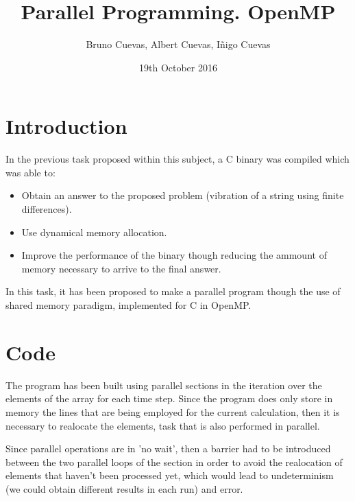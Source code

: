 \documentclass{article}
\title{Parallel Programming. OpenMP}
\author{Bruno Cuevas, Albert Cuevas, Iñigo Cuevas}
\date{19th October 2016}
\begin{document}
\maketitle

\section {Introduction}
	In the previous task proposed within this subject, a C binary was compiled
	which was able to:
	\begin{itemize}
		\item Obtain an answer to the proposed problem (vibration of a string
		 using finite differences).
		\item Use dynamical memory allocation.
		\item Improve the performance of the binary though reducing the ammount
		of memory necessary to arrive to the final answer.
	\end{itemize}
	In this task, it has been proposed to make a parallel program though the use
	of shared memory paradigm, implemented for C in OpenMP.

\section {Code}

	The program has been built using parallel sections in the iteration over
	the elements of the array for each time step. Since the program does
	only store in memory the lines that are being employed for the current
	calculation, then it is necessary to realocate the elements, task that is
	also performed in parallel.

	Since parallel operations are in 'no wait', then a barrier had to be
	introduced between the two parallel loops of the section in order to avoid
	the realocation of elements that haven't been processed yet, which would
	lead to undeterminism (we could obtain different results in
	each run) and error.
\end{document}
